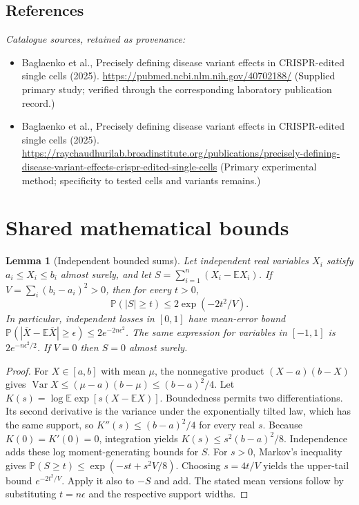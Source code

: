 \documentclass[11pt]{article}
\newcommand{\E}{\mathbb E}
\newcommand{\Prob}{\mathbb P}
\DeclareMathOperator{\Var}{Var}
\providecommand{\E}{\mathbb E}
\providecommand{\Prob}{\mathbb P}
\providecommand{\Var}{\operatorname{Var}}
\newtheorem{sharedlemma}{Lemma}[section]
\begin{document}
\subsection{References}
\noindent\emph{Catalogue sources, retained as provenance:}
\begin{itemize}
\item Baglaenko et al., Precisely defining disease variant effects in CRISPR-edited single cells (2025). \url{https://pubmed.ncbi.nlm.nih.gov/40702188/} (Supplied primary study; verified through the corresponding laboratory publication record.)
\item Baglaenko et al., Precisely defining disease variant effects in CRISPR-edited single cells (2025). \url{https://raychaudhurilab.broadinstitute.org/publications/precisely-defining-disease-variant-effects-crispr-edited-single-cells} (Primary experimental method; specificity to tested cells and variants remains.)
\end{itemize}
\clearpage


\appendix
\section{Shared mathematical bounds}\label{app:bounds}
\begin{sharedlemma}[Independent bounded sums]\label{lem:bounded}
Let independent real variables $X_i$ satisfy $a_i\leq X_i\leq b_i$ almost surely,
and let $S=\sum_{i=1}^n(X_i-\E X_i)$. If
$V=\sum_i(b_i-a_i)^2>0$, then for every $t>0$,
\[
 \Prob(|S|\geq t)\leq 2\exp(-2t^2/V).
\]
In particular, independent losses in $[0,1]$ have mean-error bound
$\Prob(|\overline X-\E\overline X|\geq\epsilon)
\leq2e^{-2n\epsilon^2}$. The same expression for variables in $[-1,1]$
is $2e^{-n\epsilon^2/2}$. If $V=0$ then $S=0$ almost surely.
\end{sharedlemma}
\begin{proof}
For $X\in[a,b]$ with mean $\mu$, the nonnegative product
$(X-a)(b-X)$ gives
$\Var X\leq(\mu-a)(b-\mu)\leq(b-a)^2/4$.
Let $K(s)=\log\E\exp[s(X-\E X)]$.
Boundedness permits two differentiations. Its second derivative is the variance
under the exponentially tilted law, which has the same support, so
$K''(s)\leq(b-a)^2/4$ for every real $s$.
Because $K(0)=K'(0)=0$, integration yields
$K(s)\leq s^2(b-a)^2/8$.
Independence adds these log moment-generating bounds for $S$.
For $s>0$, Markov's inequality gives
$\Prob(S\geq t)\leq\exp(-st+s^2V/8)$.
Choosing $s=4t/V$ yields the upper-tail bound $e^{-2t^2/V}$.
Apply it also to $-S$ and add. The stated mean versions follow by substituting
$t=n\epsilon$ and the respective support widths.
\end{proof}
\end{document}
